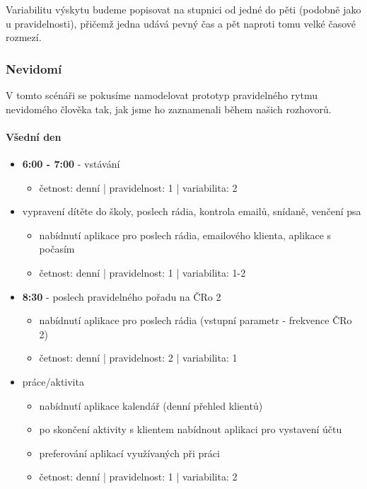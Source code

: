 \documentclass[thesis=M,czech]{FITthesis}[2012/06/26]
\begin{document}
Variabilitu výskytu budeme popisovat na stupnici od jedné do pěti (podobně jako u pravidelnosti), přičemž jedna udává pevný čas a pět naproti tomu velké časové rozmezí.

\subsubsection*{Nevidomí}
V tomto scénáři se pokusíme namodelovat prototyp pravidelného rytmu nevidomého člověka tak, jak jsme ho zaznamenali během našich rozhovorů.

\paragraph{Všední den}
\begin{itemize}
    \item \textbf{6:00 - 7:00} - vstávání
\begin{itemize}
        \item četnost: denní | pravidelnost: 1 | variabilita: 2
\end{itemize}
    \item vypravení dítěte do školy, poslech rádia, kontrola emailů, snídaně, venčení psa
\begin{itemize}
        \item nabídnutí aplikace pro poslech rádia, emailového klienta, aplikace s počasím
        \item četnost: denní | pravidelnost: 1 | variabilita: 1-2
\end{itemize}
    \item \textbf{8:30} - poslech pravidelného pořadu  na ČRo 2
\begin{itemize}
        \item nabídnutí aplikace pro poslech rádia (vstupní parametr - frekvence ČRo 2)
        \item četnost: denní | pravidelnost: 2 | variabilita: 1
\end{itemize}
    \item práce/aktivita
\begin{itemize}
        \item nabídnutí aplikace kalendář (denní přehled klientů)
        \item po skončení aktivity s klientem nabídnout aplikaci pro vystavení účtu
        \item preferování aplikací využívaných při práci
        \item četnost: denní | pravidelnost: 1 | variabilita: 2

\end{itemize}
\end{itemize}
\end{document}
